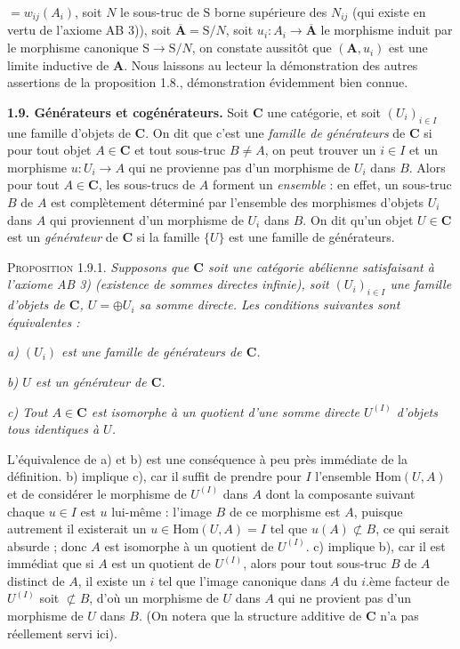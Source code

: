 
\noindent $=w_{ij}(A_i)$, soit $N$ le sous-truc de $\mathrm{S}$ borne supérieure des
$N_{ij}$ (qui existe en vertu de l'axiome AB 3)), soit
$\overline{\mathbf A}=\mathrm{S}/N$, soit $u_i:A_i\to\overline{\mathbf A}$ le morphisme
induit par le morphisme canonique $\mathrm{S}\to \mathrm{S}/N$, on constate aussitôt
que $(\mathbf A,u_i)$ est une limite inductive de $\mathbf A$. Nous laissons
au lecteur la démonstration des autres assertions de la proposition 1.8.,
démonstration évidemment bien connue.

\textbf{1.9. Générateurs et cogénérateurs.} Soit $\mathbf{C}$ une catégorie,
et soit $(U_i)_{i\in I}$ une famille d'objets de $\mathbf{C}$. On dit que c'est une
\textit{famille de générateurs} de $\mathbf{C}$ si pour tout objet $A\in \mathbf{C}$ et tout
sous-truc $B\neq A$, on peut trouver un $i\in I$ et un morphisme
$u:U_i\to A$ qui ne provienne pas d'un morphisme de $U_i$ dans
$B$. Alors pour tout $A\in \mathbf{C}$, les sous-trucs de $A$ forment un
\textit{ensemble} : en effet, un sous-truc $B$ de $A$ est complètement
déterminé par l'ensemble des morphismes d'objets $U_i$ dans $A$ qui proviennent
d'un morphisme de $U_i$ dans $B$. On dit qu'un objet $U\in \mathbf{C}$ est un
\textit{générateur} de $\mathbf{C}$ si la famille $\{U\}$ est une famille de
générateurs.

\textsc{Proposition 1.9.1.} \textit{Supposons que $\mathbf{C}$ soit une
catégorie abélienne satisfaisant à l'axiome \textup{AB 3)} (existence de sommes directes
infinie), soit $(U_i)_{i\in I}$ une famille d'objets de $\mathbf{C}$,
$U=\oplus U_i$ sa somme directe. Les conditions suivantes sont
équivalentes :}

\textit{a) $(U_i)$ est une famille de générateurs de $\mathbf{C}$.}

\textit{b) $U$ est un générateur de $\mathbf{C}$.}

\textit{c) Tout $A\in \mathbf{C}$ est isomorphe à un quotient d'une somme
directe $U^{(I)}$ d'objets tous identiques à $U$.}

L'équivalence de a) et b) est une conséquence à peu près immédiate de la
définition. b) implique c), car il suffit de prendre pour $I$ l'ensemble
$\mathrm{Hom}(U,A)$ et de considérer le morphisme de $U^{(I)}$ dans $A$ dont
la composante suivant chaque $u\in I$ est $u$ lui-même : l'image $B$ de ce
morphisme est $A$, puisque autrement il existerait un
$u\in\mathrm{Hom}(U,A)=I$ tel que $u(A)\not\subset B$, ce qui serait absurde ;
donc $A$ est isomorphe à un quotient de $U^{(I)}$. c) implique b), car il est
immédiat que si $A$ est un quotient de $U^{(I)}$, alors pour tout sous-truc
$B$ de $A$ distinct de $A$, il existe un $i$ tel que l'image canonique dans
$A$ du $i$.ème facteur de $U^{(I)}$ soit $\not\subset B$, d'où un morphisme de
$U$ dans $A$ qui ne provient pas d'un morphisme de $U$ dans $B$. (On notera
que la structure additive de $\mathbf{C}$ n'a pas réellement servi ici).

